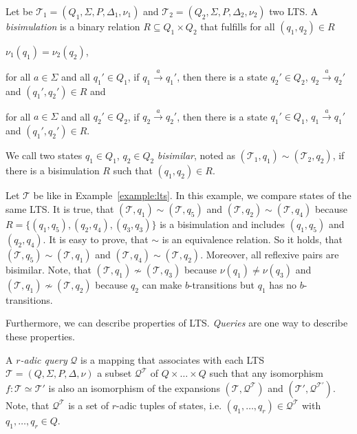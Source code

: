 \begin{definition}
    Let be $\mathcal{T}_1 = (Q_1, \Sigma, P, \Delta_1, \nu_1)$ and $\mathcal{T}_2 = (Q_2, \Sigma, P, \Delta_2, \nu_2)
    $ two LTS. A \emph{bisimulation} is a binary relation $R \subseteq Q_1 \times Q_2$ that fulfills for all $(q_1,
    q_2) \in R$
    \begin{compactitem}
        \item $\nu_1 (q_1) = \nu_2 (q_2)$,
        \item for all $a \in \Sigma$ and all $q_1' \in Q_1$, if $q_1 \overset{a}{\rightarrow} q_1'$, then there
        is a state $q_2' \in Q_2$, $q_2 \overset{a}{\rightarrow} q_2'$ and $(q_1', q_2') \in R$ and
        \item for all $a \in \Sigma$ and all $q_2' \in Q_2$, if $q_2 \overset{a}{\rightarrow} q_2'$, then there is a
        state $q_1' \in Q_1$, $q_1 \overset{a}{\rightarrow} q_1'$ and $(q_1', q_2') \in R$.
    \end{compactitem}
    We call two states $q_1 \in Q_1$, $q_2 \in Q_2$ \emph{bisimilar}, noted as $(\mathcal{T}_1, q_1) \sim
    (\mathcal{T}_2, q_2)$, if there
    is a bisimulation $R$ such that $(q_1, q_2) \in R$.
\end{definition}

\begin{example}
    \label{example:bisimilar}
    Let $\mathcal{T}$ be like in Example~\ref{example:lts}. In this example, we compare states of the same LTS. It is
    true, that $(\mathcal{T}, q_1) \sim (\mathcal{T}, q_5)$ and $(\mathcal{T}, q_2) \sim (\mathcal{T}, q_4)$ because
    $R = \{(q_1, q_5), (q_2, q_4), (q_3, q_3)\}$ is a bisimulation and includes $(q_1, q_5)$ and $(q_2, q_4)$. It is
    easy to prove, that $\sim$ is an equivalence relation. So it holds, that $(\mathcal{T}, q_5) \sim (\mathcal{T},
    q_1)$ and $(\mathcal{T}, q_4) \sim (\mathcal{T}, q_2)$. Moreover, all reflexive pairs are bisimilar. Note, that
    $(\mathcal{T}, q_1) \not\sim (\mathcal{T}, q_3)$ because $\nu(q_1) \neq \nu(q_3)$ and $(\mathcal{T}, q_1)
    \not\sim (\mathcal{T}, q_2)$ because $q_2$ can make $b$-transitions but $q_1$ has no $b$-transitions.
\end{example}

Furthermore, we can describe properties of LTS. \textit{Queries} are one way to describe these properties.

\begin{definition}{\cite{otto1999bisimulation}}
    \label{definition:query}
    A \emph{$r$-adic query} $\mathcal{Q}$ is a mapping that associates with each LTS $\mathcal{T} = (Q, \Sigma, P,
    \Delta, \nu)$ a subset $\mathcal{Q}^{\mathcal{T}}$ of $Q \times \dots \times Q$ such that any isomorphism $f:
    \mathcal{T} \simeq \mathcal{T}'$ is also an isomorphism of the expansions $(\mathcal{T}, \mathcal{Q}^{\mathcal{T}})$
    and $({\mathcal{T}}', \mathcal{Q}^{{\mathcal{T}}'})$. Note, that $\mathcal{Q}^{\mathcal{T}}$ is a set of $r$-adic
    tuples of states, i.e. $(q_1, \dots, q_r) \in \mathcal{Q}^{\mathcal{T}}$ with $q_1, \dots, q_r \in Q$.
\end{definition}

